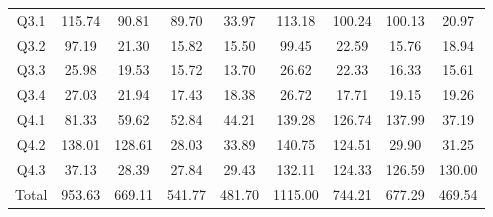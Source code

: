 \begin{table}[]
{\begin{tabular}{@{}ccccccccc@{}}
    Q3.1                       & \multicolumn{1}{c}{115.74}    & \multicolumn{1}{c}{90.81}     & \multicolumn{1}{c}{89.70}      & 33.97      & \multicolumn{1}{c}{113.18}    & \multicolumn{1}{c}{100.24}    & \multicolumn{1}{c}{100.13}     & 20.97      \\ 
    Q3.2                       & \multicolumn{1}{c}{97.19}     & \multicolumn{1}{c}{21.30}     & \multicolumn{1}{c}{15.82}      & 15.50      & \multicolumn{1}{c}{99.45}     & \multicolumn{1}{c}{22.59}     & \multicolumn{1}{c}{15.76}      & 18.94      \\ 
    Q3.3                       & \multicolumn{1}{c}{25.98}     & \multicolumn{1}{c}{19.53}     & \multicolumn{1}{c}{15.72}      & 13.70      & \multicolumn{1}{c}{26.62}     & \multicolumn{1}{c}{22.33}     & \multicolumn{1}{c}{16.33}      & 15.61      \\ 
    Q3.4                       & \multicolumn{1}{c}{27.03}     & \multicolumn{1}{c}{21.94}     & \multicolumn{1}{c}{17.43}      & 18.38      & \multicolumn{1}{c}{26.72}     & \multicolumn{1}{c}{17.71}     & \multicolumn{1}{c}{19.15}      & 19.26      \\ 
    Q4.1                       & \multicolumn{1}{c}{81.33}     & \multicolumn{1}{c}{59.62}     & \multicolumn{1}{c}{52.84}      & 44.21      & \multicolumn{1}{c}{139.28}    & \multicolumn{1}{c}{126.74}    & \multicolumn{1}{c}{137.99}     & 37.19      \\ 
    Q4.2                       & \multicolumn{1}{c}{138.01}    & \multicolumn{1}{c}{128.61}    & \multicolumn{1}{c}{28.03}      & 33.89      & \multicolumn{1}{c}{140.75}    & \multicolumn{1}{c}{124.51}    & \multicolumn{1}{c}{29.90}      & 31.25      \\ 
    Q4.3                       & \multicolumn{1}{c}{37.13}     & \multicolumn{1}{c}{28.39}     & \multicolumn{1}{c}{27.84}      & 29.43      & \multicolumn{1}{c}{132.11}    & \multicolumn{1}{c}{124.33}    & \multicolumn{1}{c}{126.59}     & 130.00     \\ 
    Total                      & \multicolumn{1}{c}{953.63}    & \multicolumn{1}{c}{669.11}    & \multicolumn{1}{c}{541.77}     & 481.70     & \multicolumn{1}{c}{1115.00}   & \multicolumn{1}{c}{744.21}    & \multicolumn{1}{c}{677.29}     & 469.54     \\ \bottomrule
    \end{tabular}%
    }
    \end{table}

